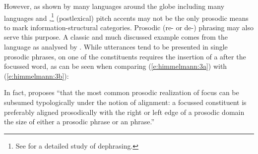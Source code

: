 \documentclass[output=paper
,modfonts
,nonflat]{langsci/langscibook}
\begin{document}
However, as shown by many languages around the globe including many  languages and ,\footnote{See \citet{Jun1998} for a detailed study of  dephrasing.} (postlexical) pitch accents may not be the only prosodic means to mark information-structural categories. Prosodic (re- or de-) phrasing may also serve this purpose. A classic and much discussed example comes from the  language  as analysed by \citet{Kanerva1990}. While  utterances tend to be presented in single prosodic phrases,  on one of the constituents requires the insertion of a  after the focussed word, as can be seen when comparing (\ref{e:himmelmann:3a}) with (\ref{e:himmelmann:3b}):


\noindent
In fact, \citet[683]{Féry2013} proposes “that the most common prosodic realization of focus can be subsumed typologically under the notion of alignment: a focussed constituent is preferably aligned prosodically with the right or left edge of a prosodic domain the size of either a prosodic phrase or an  phrase.” 
\end{document}
